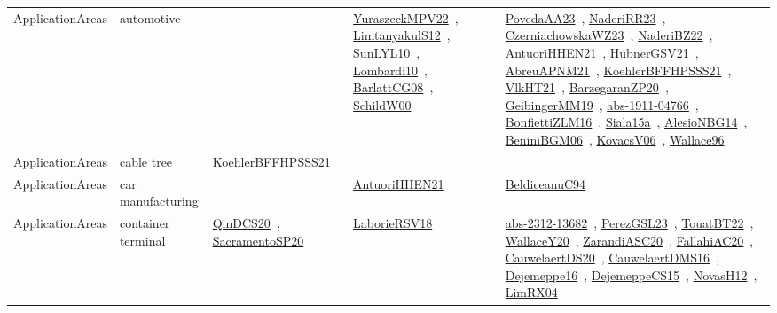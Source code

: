 {\begin{longtable}{lp{3cm}>{\raggedright\arraybackslash}p{6cm}>{\raggedright\arraybackslash}p{6cm}>{\raggedright\arraybackslash}p{8cm}}
ApplicationAreas & automotive &  & \href{works/YuraszeckMPV22.pdf}{YuraszeckMPV22}~\cite{YuraszeckMPV22}, \href{works/LimtanyakulS12.pdf}{LimtanyakulS12}~\cite{LimtanyakulS12}, \href{works/SunLYL10.pdf}{SunLYL10}~\cite{SunLYL10}, \href{works/Lombardi10.pdf}{Lombardi10}~\cite{Lombardi10}, \href{works/BarlattCG08.pdf}{BarlattCG08}~\cite{BarlattCG08}, \href{works/SchildW00.pdf}{SchildW00}~\cite{SchildW00} & \href{works/PovedaAA23.pdf}{PovedaAA23}~\cite{PovedaAA23}, \href{works/NaderiRR23.pdf}{NaderiRR23}~\cite{NaderiRR23}, \href{works/CzerniachowskaWZ23.pdf}{CzerniachowskaWZ23}~\cite{CzerniachowskaWZ23}, \href{works/NaderiBZ22.pdf}{NaderiBZ22}~\cite{NaderiBZ22}, \href{works/AntuoriHHEN21.pdf}{AntuoriHHEN21}~\cite{AntuoriHHEN21}, \href{works/HubnerGSV21.pdf}{HubnerGSV21}~\cite{HubnerGSV21}, \href{works/AbreuAPNM21.pdf}{AbreuAPNM21}~\cite{AbreuAPNM21}, \href{works/KoehlerBFFHPSSS21.pdf}{KoehlerBFFHPSSS21}~\cite{KoehlerBFFHPSSS21}, \href{works/VlkHT21.pdf}{VlkHT21}~\cite{VlkHT21}, \href{works/BarzegaranZP20.pdf}{BarzegaranZP20}~\cite{BarzegaranZP20}, \href{works/GeibingerMM19.pdf}{GeibingerMM19}~\cite{GeibingerMM19}, \href{works/abs-1911-04766.pdf}{abs-1911-04766}~\cite{abs-1911-04766}, \href{works/BonfiettiZLM16.pdf}{BonfiettiZLM16}~\cite{BonfiettiZLM16}, \href{works/Siala15a.pdf}{Siala15a}~\cite{Siala15a}, \href{works/AlesioNBG14.pdf}{AlesioNBG14}~\cite{AlesioNBG14}, \href{works/BeniniBGM06.pdf}{BeniniBGM06}~\cite{BeniniBGM06}, \href{works/KovacsV06.pdf}{KovacsV06}~\cite{KovacsV06}, \href{works/Wallace96.pdf}{Wallace96}~\cite{Wallace96}\\
ApplicationAreas & cable tree & \href{works/KoehlerBFFHPSSS21.pdf}{KoehlerBFFHPSSS21}~\cite{KoehlerBFFHPSSS21} &  & \\
ApplicationAreas & car manufacturing &  & \href{works/AntuoriHHEN21.pdf}{AntuoriHHEN21}~\cite{AntuoriHHEN21} & \href{works/BeldiceanuC94.pdf}{BeldiceanuC94}~\cite{BeldiceanuC94}\\
ApplicationAreas & container terminal & \href{works/QinDCS20.pdf}{QinDCS20}~\cite{QinDCS20}, \href{works/SacramentoSP20.pdf}{SacramentoSP20}~\cite{SacramentoSP20} & \href{works/LaborieRSV18.pdf}{LaborieRSV18}~\cite{LaborieRSV18} & \href{works/abs-2312-13682.pdf}{abs-2312-13682}~\cite{abs-2312-13682}, \href{works/PerezGSL23.pdf}{PerezGSL23}~\cite{PerezGSL23}, \href{works/TouatBT22.pdf}{TouatBT22}~\cite{TouatBT22}, \href{works/WallaceY20.pdf}{WallaceY20}~\cite{WallaceY20}, \href{works/ZarandiASC20.pdf}{ZarandiASC20}~\cite{ZarandiASC20}, \href{works/FallahiAC20.pdf}{FallahiAC20}~\cite{FallahiAC20}, \href{works/CauwelaertDS20.pdf}{CauwelaertDS20}~\cite{CauwelaertDS20}, \href{works/CauwelaertDMS16.pdf}{CauwelaertDMS16}~\cite{CauwelaertDMS16}, \href{works/Dejemeppe16.pdf}{Dejemeppe16}~\cite{Dejemeppe16}, \href{works/DejemeppeCS15.pdf}{DejemeppeCS15}~\cite{DejemeppeCS15}, \href{works/NovasH12.pdf}{NovasH12}~\cite{NovasH12}, \href{works/LimRX04.pdf}{LimRX04}~\cite{LimRX04}\\

\end{longtable}}
